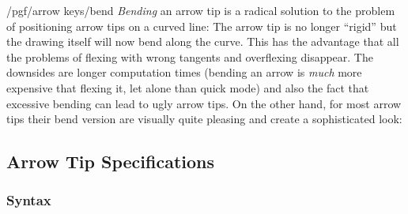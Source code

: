 \begin{key}{/pgf/arrow keys/bend}
    \emph{Bending} an arrow tip is a radical solution to the problem of
    positioning arrow tips on a curved line: The arrow tip is no longer
    ``rigid'' but the drawing itself will now bend along the curve. This has
    the advantage that all the problems of flexing with wrong tangents and
    overflexing disappear. The downsides are longer computation times (bending
    an arrow is \emph{much} more expensive that flexing it, let alone than
    quick mode) and also the fact that excessive bending can lead to ugly arrow
    tips. On the other hand, for most arrow tips their bend version are
    visually quite pleasing and create a sophisticated look:
\begin{codeexample}[]
\end{codeexample}
\begin{codeexample}[]
\end{codeexample}
\begin{codeexample}[]
\end{codeexample}
\end{key}


\subsection{Arrow Tip Specifications}
\label{section-arrow-spec}

\subsubsection{Syntax}

